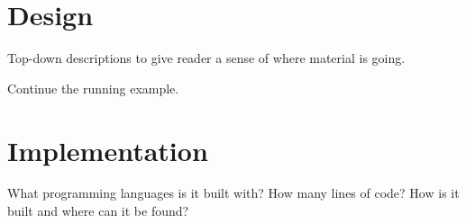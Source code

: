 \section{Design}
\label{sec:design}
Top-down descriptions to give reader a sense
of where material is going.

Continue the running example.


\section{Implementation}
\label{sec:impl}
What programming languages is it built with?
How many lines of code?
How is it built and where can it be found?
